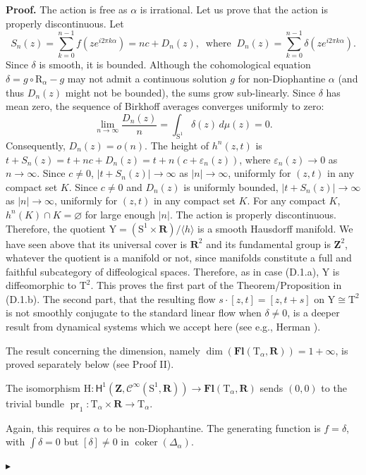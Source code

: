 \documentclass[10pt,letterpaper,reqno]{amsart}
\theoremstyle{article}
\renewenvironment{proof}{\noindent \textbf{Proof.}} {\nolinebreak $\blacktriangleright$}
\newcommand{\1}{{\hat 1}}
\newcommand{\0}{{\hat 0}}
\newcommand{\RR}{\mathbf R}
\newcommand{\ZZ}{\mathbf Z}
\newcommand{\sfbH}{{\boldsymbol{\mathsf H}}}
\def \H{\mathrm H}
\def \R{\mathrm R}
\def \S{\mathrm S}
\def \T{\mathrm T}
\def \Y{\mathrm Y}
\newcommand{\coker}{\operatorname{coker}}
\newcommand{\cl}[1]{\left[ #1 \right]}
\newcommand{\Cinfty}{\mathcal{C}^\infty}
\DeclareMathOperator{\Fb}{\boldsymbol{\mathsf{Fl}}}
\newcommand{\pr}{\operatorname{pr}}
\renewcommand{\Fb}{\mathbf{Fl}}
\let \epsilon=\varepsilon
\def \H{\mathrm H}
\begin{document}
\begin{proof}
    The action is free as $\alpha$ is irrational.
    Let us prove that the action is properly discontinuous.
    Let
    $$
      S_n(z) = \sum_{k=0}^{n-1} f(z e^{i2\pi k \alpha}) = nc + D_n(z),
      \ \text{ where } \
      D_n(z) = \sum_{k=0}^{n-1} \delta(z e^{i2\pi k \alpha}).
      $$
    Since $\delta$ is smooth, it is bounded.
    Although the cohomological equation $\delta = g \circ \R_\alpha - g$ may not admit a continuous solution $g$ for non-Diophantine $\alpha$ (and thus $D_n(z)$ might not be bounded), the sums grow sub-linearly.
    Since $\delta$ has mean zero, the sequence of Birkhoff averages converges uniformly to zero:
    $$
      \lim_{n \to \infty} \frac{D_n(z)}{n} = \int_{\S^1} \delta(z)\, d\mu(z) = 0.
      $$
    Consequently, $D_n(z) = o(n)$.
    The height of $h^n(z,t)$ is $t + S_n(z) = t + nc + D_n(z) = t + n(c + \epsilon_n(z))$, where $\epsilon_n(z) \to 0$ as $n \to \infty$.
    Since $c \neq 0$,
    $|t+S_n(z)| \to \infty$ as $|n| \to \infty$,
    uniformly for $(z,t)$ in any compact set $K$.
    Since $c \neq 0$ and $D_n(z)$ is uniformly bounded,
    $|t+S_n(z)| \to \infty$ as $|n| \to \infty$,
    uniformly for $(z,t)$ in any compact set $K$.
    For any compact $K$,
    $h^n(K) \cap K = \varnothing$ for large enough $|n|$.
    The action is properly discontinuous.
    Therefore,
    the quotient $\Y = (\S^1 \times \RR) / \langle h \rangle$ is a smooth Hausdorff manifold.
    We have seen above that its universal cover is $\RR^2$ and its fundamental group is $\ZZ^2$,
    whatever the quotient is a manifold or not,
    since manifolds constitute a full and faithful subcategory of diffeological spaces.
    Therefore,
    as in case (D.1.a),
    $\Y$ is diffeomorphic to $\T^2$.
    This proves the first part of the Theorem/Proposition in (D.1.b).
    The second part,
    that the resulting flow $s \cdot \cl{z,t} = \cl{z, t+s}$ on $\Y \cong \T^2$ is not smoothly conjugate to the standard linear flow when $\delta \neq 0$,
    is a deeper result from dynamical systems which we accept here (see e.g., Herman \cite{Her79}).
    
    The result concerning the dimension,
    namely $\dim(\Fb(\T_\alpha,\RR)) = 1 + \infty$,
    is proved separately below (see Proof II).
    
    \quad
    The isomorphism $\H : \sfbH^1(\ZZ,\Cinfty(\S^1,\RR)) \to \Fb(\T_\alpha,\RR)$ sends $(0,0)$ to the trivial bundle $\pr_1 : \T_\alpha \times \RR \to \T_\alpha$.
    
    \quad
    Again,
    this requires $\alpha$ to be non-Diophantine.
    The generating function is $f=\delta$,
    with $\int \delta = 0$ but $\cl{\delta} \ne 0$ in $\coker(\Delta_\alpha)$.
    

\end{proof}
\end{document}
